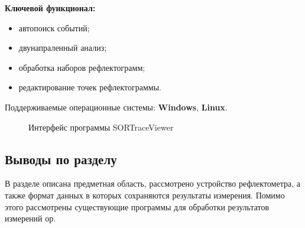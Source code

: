 \textbf{Ключевой функционал:} \cite{web:sortraceviewer}
\begin{itemize}
  \item автопоиск событий;
  \item двунапраленный анализ;
  \item обработка наборов рефлектограмм;
  \item редактирование точек рефлектограммы.
\end{itemize}

Поддерживаемые операционные системы: \textbf{Windows}, \textbf{Linux}.

\begin{figure}[H]
  \caption{Интерфейс программы SORTraceViewer}
  \label{ris:sortraceviewer}
\end{figure}

\subsection{Выводы по разделу}

В разделе описана предметная область, рассмотрено устройство рефлектометра, а также формат данных в которых сохраняются результаты измерения. Помимо этого рассмотрены существующие программы для обработки результатов измерений \acrshort{ор}.
